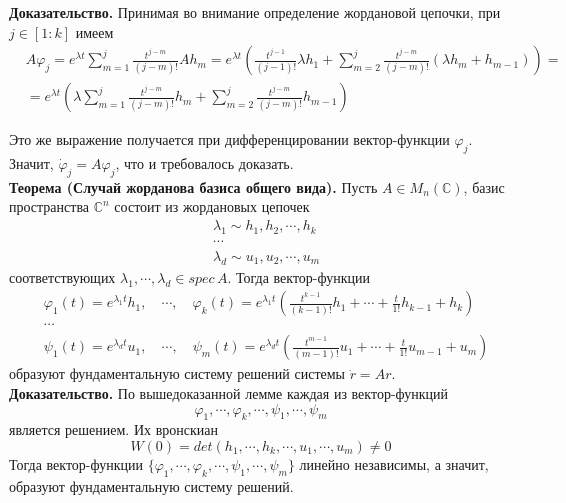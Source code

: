 \documentclass{article}
\begin{document}
\noindent \textbf{Доказательство.} Принимая во внимание определение жордановой цепочки, при $j \in [1 : k]$ имеем
\begin{equation*}
    \begin{aligned}
        &A\varphi_j = e^{\lambda t}\sum_{m=1}^j \frac{t^{j-m}}{(j-m)!}Ah_m = e^{\lambda t} \left(\frac{t^{j-1}}{(j-1)!}\lambda h_1 + \sum_{m=2}^j \frac{t^{j-m}}{(j-m)!}(\lambda h_m + h_{m - 1}) \right) = \\
        &= e^{\lambda t}\left(\lambda \sum_{m=1}^j \frac{t^{j - m}}{(j - m)!}h_m + \sum_{m = 2}^j \frac{t^{j-m}}{(j - m)!}h_{m-1} \right)
    \end{aligned}
\end{equation*}

Это же выражение получается при дифференцировании вектор-функции $\varphi_j$. Значит, $\dot{\varphi}_j = A\varphi_j$, что и требовалось доказать.\\

\noindent \textbf{Теорема (Случай жорданова базиса общего вида).} Пусть $A \in M_n(\mathbb{C})$, базис пространства $\mathbb{C}^n$ состоит из жордановых цепочек
\begin{equation*}
    \begin{aligned}
        &\lambda_1 \sim h_1, h_2, \cdots, h_k\\
        &\cdots\\
        &\lambda_d \sim u_1, u_2, \cdots, u_m
    \end{aligned}
\end{equation*}
соответствующих $\lambda_1, \cdots, \lambda_d \in spec\, A$. Тогда вектор-функции
\begin{equation*}
    \begin{aligned}
        &\varphi_1(t) = e^{\lambda_1 t}h_1, \quad \cdots, \quad \varphi_k(t) = e^{\lambda_1 t}\left(\frac{t^{k-1}}{(k-1)!}h_1 + \cdots + \frac{t}{1!}h_{k-1} + h_k \right)\\
        &\cdots\\
        &\psi_1(t) = e^{\lambda_d t}u_1, \quad \cdots, \quad \psi_m(t) = e^{\lambda_d t}\left(\frac{t^{m-1}}{(m-1)!}u_1 + \cdots + \frac{t}{1!}u_{m-1} + u_m \right)
    \end{aligned}
\end{equation*}
образуют фундаментальную систему решений системы $\dot{r} = Ar$.\\

\noindent \textbf{Доказательство.} По вышедоказанной лемме каждая из вектор-функций
\begin{equation*}
    \varphi_1, \cdots, \varphi_k, \cdots, \psi_1, \cdots, \psi_m
\end{equation*}
является решением. Их вронскиан
\begin{equation*}
    W(0) = det(h_1, \cdots, h_k, \cdots, u_1, \cdots, u_m) \neq 0
\end{equation*}
Тогда вектор-функции $\{\varphi_1, \cdots, \varphi_k, \cdots, \psi_1, \cdots, \psi_m\}$ линейно независимы, а значит, образуют фундаментальную систему решений.\\
\end{document}
